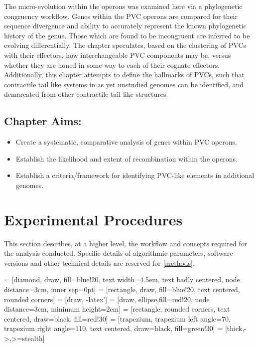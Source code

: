 The micro-evolution within the operons was examined here via a phylogenetic congruency workflow. Genes within the PVC operons are compared for their sequence divergence and ability to accurately represent the known phylogenetic history of the genus. Those which are found to be incongruent are inferred to be evolving differentially. The chapter speculates, based on the clustering of PVCs with their effectors, how interchangeable PVC components may be, versus whether they are honed in some way to each of their cognate effectors. Additionally, this chapter attempts to define the hallmarks of PVCs, such that contractile tail like systems in as yet unstudied genomes can be identified, and demarcated from other contractile tail like structures.

\subsection*{Chapter Aims:}
\begin{itemize}
	\item Create a systematic, comparative analysis of genes within PVC operons.
	\item Establish the likelihood and extent of recombination within the operons.
	\item Establish a criteria/framework for identifying PVC-like elements in additional genomes.
\end{itemize}

\section{Experimental Procedures}
This section describes, at a higher level, the workflow and concepts required for the analysis conducted. Specific details of algorithmic parameters, software versions and other technical details are reserved for \vref{methods}.

\vspace{0.5cm}
 = [diamond, draw, fill=blue!20, text width=4.5em, text badly centered, node distance=3cm, inner sep=0pt]
 = [rectangle, draw, fill=blue!20, text centered, rounded corners]
 = [draw, -latex']
 = [draw, ellipse,fill=red!20, node distance=3cm, minimum height=2em]
 = [rectangle, rounded corners, text centered, draw=black, fill=red!30]
 = [trapezium, trapezium left angle=70, trapezium right angle=110, text centered, draw=black, fill=green!30]
 = [thick,->,>=stealth]

